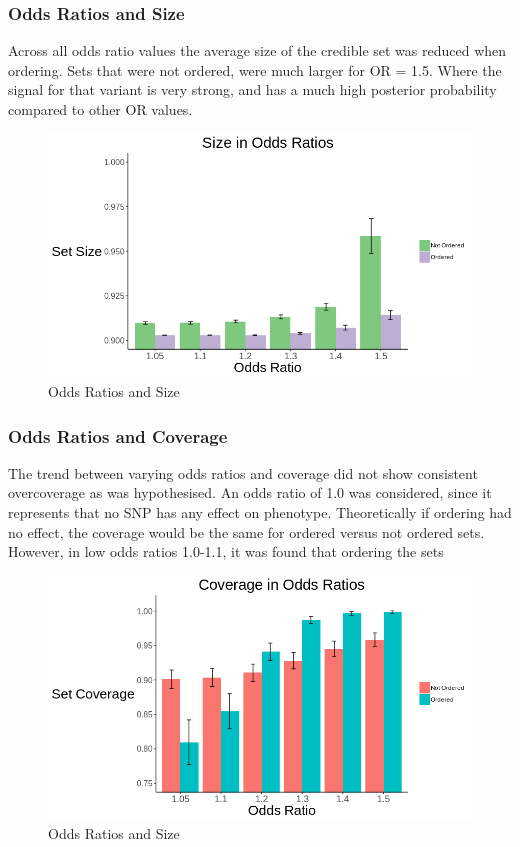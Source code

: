 \subsubsection{Odds Ratios and Size}
Across all odds ratio values the average size of the credible set was reduced when ordering. Sets that were not ordered, were much larger for OR = 1.5. Where the signal for that variant is very strong, and has a much high posterior probability compared to other OR values.


\begin{figure}[H]
\centering
\includegraphics[scale=0.625]{images/Barplots/OR_Size.png}
\caption{Odds Ratios and Size}
\label{fig: OR_Size}
\end{figure}

\subsubsection{Odds Ratios and Coverage}
The trend between varying odds ratios and coverage did not show consistent overcoverage as was hypothesised. An odds ratio of 1.0 was considered, since it represents that no SNP has any effect on phenotype. Theoretically if ordering had no effect, the coverage would be the same for ordered versus not ordered sets. However, in low odds ratios 1.0-1.1, it was found that ordering the sets 


\begin{figure}[H]
\centering
\includegraphics[scale=0.625]{images/Barplots/OR_Cov.png}
\caption{Odds Ratios and Size}
\label{fig: OR_Size}
\end{figure}


